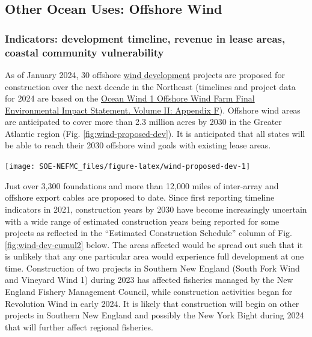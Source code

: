 \documentclass[
  10pt,
]{article}
\let\origfigure\figure
\let\endorigfigure\endfigure
\renewenvironment{figure}[1][2] {
    \expandafter\origfigure\expandafter[H]
} {
    \endorigfigure
}
\begin{document}
\hypertarget{wind-risks}{%
\subsection{Other Ocean Uses: Offshore Wind}\label{wind-risks}}

\hypertarget{indicators-development-timeline-revenue-in-lease-areas-coastal-community-vulnerability}{%
\subsubsection{Indicators: development timeline, revenue in lease areas, coastal community vulnerability}\label{indicators-development-timeline-revenue-in-lease-areas-coastal-community-vulnerability}}

As of January 2024, 30 offshore \href{https://noaa-edab.github.io/catalog/wind_dev_speed.html}{wind development} projects are proposed for construction over the next decade in the Northeast (timelines and project data for 2024 are based on the \href{https://www.boem.gov/sites/default/files/documents/renewable-energy/state-activities/Ocean_Wind1_FEIS_App_F_Planned\%20Activities\%20Scenario.pdf}{Ocean Wind 1 Offshore Wind Farm Final Environmental Impact Statement. Volume II: Appendix F}). Offshore wind areas are anticipated to cover more than 2.3 million acres by 2030 in the Greater Atlantic region (Fig. \ref{fig:wind-proposed-dev}). It is anticipated that all states will be able to reach their 2030 offshore wind goals with existing lease areas.

\begin{figure}

{\centering \texttt{[image: SOE-NEFMC\_files/figure-latex/wind-proposed-dev-1]} 

}

\caption{Proposed wind development on the northeast shelf.}\label{fig:wind-proposed-dev}
\end{figure}

Just over 3,300 foundations and more than 12,000 miles of inter-array and offshore export cables are proposed to date. Since first reporting timeline indicators in 2021, construction years by 2030 have become increasingly uncertain with a wide range of estimated construction years being reported for some projects as reflected in the ``Estimated Construction Schedule'' column of Fig. \ref{fig:wind-dev-cumul2} below. The areas affected would be spread out such that it is unlikely that any one particular area would experience full development at one time. Construction of two projects in Southern New England (South Fork Wind and Vineyard Wind 1) during 2023 has affected fisheries managed by the New England Fishery Management Council, while construction activities began for Revolution Wind in early 2024. It is likely that construction will begin on other projects in Southern New England and possibly the New York Bight during 2024 that will further affect regional fisheries.
\end{document}
